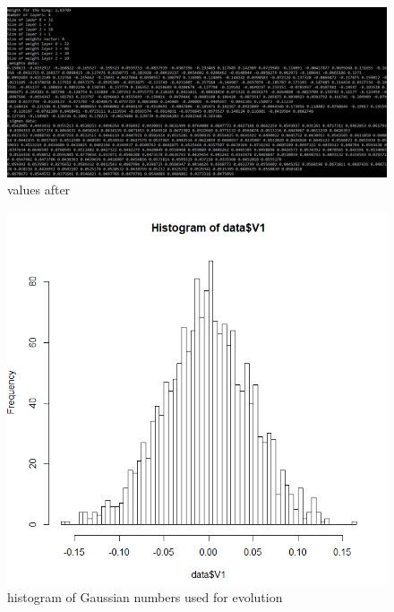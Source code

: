 \documentclass{article}
\begin{document}
\begin{figure}
    \includegraphics[width=\linewidth]{images/3-10-1-after.png}
    \caption{values after}
    \label{fig:3-10-1-after}
\end{figure}


\begin{figure}
    \includegraphics[width=\linewidth]{images/gaussian-1.png}
    \caption{histogram of Gaussian numbers used for evolution}
    \label{fig:gaussian-1}
\end{figure}
\end{document}
